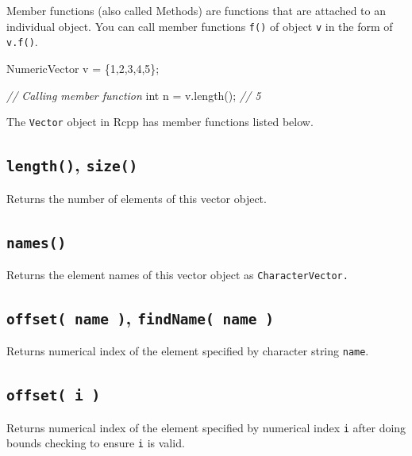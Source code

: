 \documentclass[]{book}
\newenvironment{Shaded}{\begin{snugshade}}{\end{snugshade}}
\newcommand{\CommentTok}[1]{\textcolor[rgb]{0.56,0.35,0.01}{\textit{#1}}}
\newcommand{\DataTypeTok}[1]{\textcolor[rgb]{0.13,0.29,0.53}{#1}}
\newcommand{\DecValTok}[1]{\textcolor[rgb]{0.00,0.00,0.81}{#1}}
\newcommand{\NormalTok}[1]{#1}
\begin{document}
Member functions (also called Methods) are functions that are attached to an individual object. You can call member functions \texttt{f()} of object \texttt{v} in the form of \texttt{v.f()}.

\begin{Shaded}
\begin{Highlighting}[]
\NormalTok{NumericVector v = \{}\DecValTok{1}\NormalTok{,}\DecValTok{2}\NormalTok{,}\DecValTok{3}\NormalTok{,}\DecValTok{4}\NormalTok{,}\DecValTok{5}\NormalTok{\};}

\CommentTok{// Calling member function}
\DataTypeTok{int}\NormalTok{ n = v.length(); }\CommentTok{// 5}
\end{Highlighting}
\end{Shaded}

The \texttt{Vector} object in Rcpp has member functions listed below.

\hypertarget{length-size}{%
\subsection{\texorpdfstring{\texttt{length()}, \texttt{size()}}{length(), size()}}\label{length-size}}

Returns the number of elements of this vector object.

\hypertarget{names}{%
\subsection{\texorpdfstring{\texttt{names()}}{names()}}\label{names}}

Returns the element names of this vector object as \texttt{CharacterVector.}

\hypertarget{offset-name-findname-name}{%
\subsection{\texorpdfstring{\texttt{offset(\ name\ )}, \texttt{findName(\ name\ )}}{offset( name ), findName( name )}}\label{offset-name-findname-name}}

Returns numerical index of the element specified by character string \texttt{name}.

\hypertarget{offset-i}{%
\subsection{\texorpdfstring{\texttt{offset(\ i\ )}}{offset( i )}}\label{offset-i}}

Returns numerical index of the element specified by numerical index \texttt{i} after doing bounds checking to ensure \texttt{i} is valid.
\end{document}
